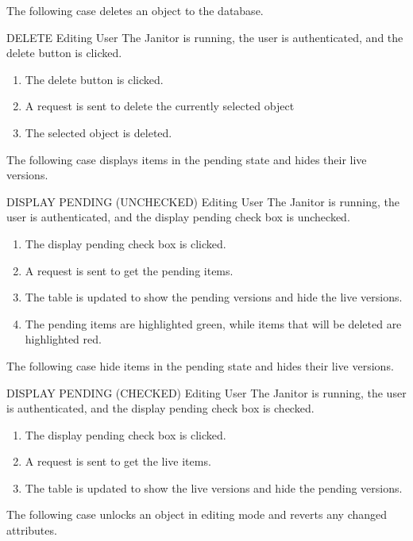 The following case deletes an object to the database.

\begin{usecase}
  {DELETE}
  {Editing User}
  {The Janitor is running, the user is authenticated, and the delete button is clicked.}
\begin{enumerate}
\item The delete button is clicked.
\item A request is sent to delete the currently selected object
\item The selected object is deleted.
\end{enumerate}
\end{usecase}

The following case displays items in the pending state and hides their live versions.

\begin{usecase}
  {DISPLAY PENDING (UNCHECKED)}
  {Editing User}
  {The Janitor is running, the user is authenticated, and the display pending check box is unchecked.}
\begin{enumerate}
\item The display pending check box is clicked.
\item A request is sent to get the pending items.
\item The table is updated to show the pending versions and hide the live versions.
\item The pending items are highlighted green, while items that will be deleted are highlighted red.
\end{enumerate}
\end{usecase}

The following case hide items in the pending state and hides their live versions.

\begin{usecase}
  {DISPLAY PENDING (CHECKED)}
  {Editing User}
  {The Janitor is running, the user is authenticated, and the display pending check box is checked.}
\begin{enumerate}
\item The display pending check box is clicked.
\item A request is sent to get the live items.
\item The table is updated to show the live versions and hide the pending versions.
\end{enumerate}
\end{usecase}

The following case unlocks an object in editing mode and reverts any changed attributes.

